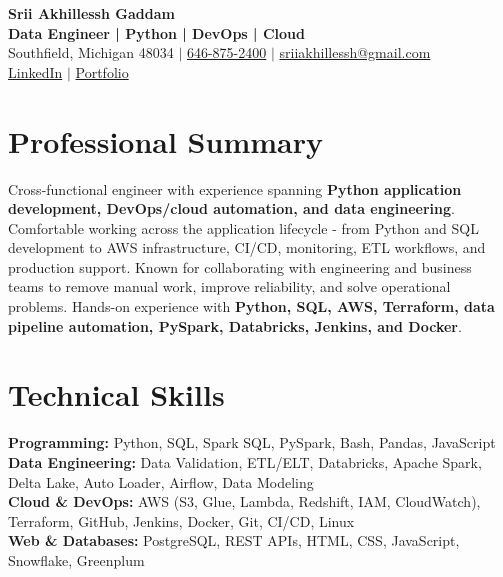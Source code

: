 \documentclass[letterpaper,10pt]{article}
\begin{document}
\fontsize{9.35pt}{10.45pt}\selectfont

\begin{center}
    {\LARGE \textbf{Srii Akhillessh Gaddam}} \\[-1pt]
    \textbf{Data Engineer | Python | DevOps | Cloud} \\[2pt]
    Southfield, Michigan 48034 $|$
    \href{tel:6468752400}{646-875-2400} $|$
    \href{mailto:sriiakhillessh@gmail.com}{sriiakhillessh@gmail.com} \\[1pt]
    \href{https://www.linkedin.com/in/srii-akhiilessh-gaddam-b48668191/}{LinkedIn} $|$
    \href{https://sriiakhillesshg.github.io/portfolio/}{Portfolio}
\end{center}
\vspace{-8pt}

\section{Professional Summary}
\small{Cross-functional engineer with experience spanning \textbf{Python application development, DevOps/cloud automation, and data engineering}. Comfortable working across the application lifecycle - from Python and SQL development to AWS infrastructure, CI/CD, monitoring, ETL workflows, and production support. Known for collaborating with engineering and business teams to remove manual work, improve reliability, and solve operational problems. Hands-on experience with \textbf{Python, SQL, AWS, Terraform, data pipeline automation, PySpark, Databricks, Jenkins, and Docker}.}

\section{Technical Skills}
\small{
\textbf{Programming:} Python, SQL, Spark SQL, PySpark, Bash, Pandas, JavaScript \\
\textbf{Data Engineering:} Data Validation, ETL/ELT, Databricks, Apache Spark, Delta Lake, Auto Loader, Airflow, Data Modeling \\
\textbf{Cloud \& DevOps:} AWS (S3, Glue, Lambda, Redshift, IAM, CloudWatch), Terraform, GitHub, Jenkins, Docker, Git, CI/CD, Linux \\
\textbf{Web \& Databases:} PostgreSQL, REST APIs, HTML, CSS, JavaScript, Snowflake, Greenplum
}

\end{document}

